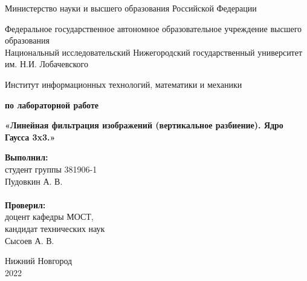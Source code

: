 \documentclass{report}
\begin{document}
\begin{titlepage}

\begin{center}
Министерство науки и высшего образования Российской Федерации
\end{center}

\begin{center}
Федеральное государственное автономное образовательное учреждение высшего образования \\
Национальный исследовательский Нижегородский государственный университет им. Н.И. Лобачевского
\end{center}

\begin{center}
Институт информационных технологий, математики и механики
\end{center}

\vspace{4em}

\begin{center}
\textbf{ по лабораторной работе} \\
\end{center}
\begin{center}
\textbf{\Large«Линейная фильтрация изображений (вертикальное разбиение). Ядро Гаусса 3x3.»} \\
\end{center}

\vspace{4em}

\newbox{\lbox}
\newlength{\maxl}
\setlength{\maxl}{\wd\lbox}
\hfill\parbox{7cm}{
\hspace*{5cm}\hspace*{-5cm}\textbf{Выполнил:} \\ студент группы 381906-1 \\ Пудовкин А. В.\\
\\
\hspace*{5cm}\hspace*{-5cm}\textbf{Проверил:}\\ доцент кафедры МОСТ, \\ кандидат технических наук \\ Сысоев А. В.\\
 }
\vspace{\fill}

\begin{center} Нижний Новгород \\ 2022 \end{center}

\end{titlepage}
\end{document}
